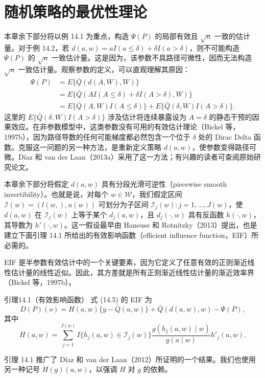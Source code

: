 \section{随机策略的最优性理论}

本章余下部分将以例 14.1 为重点，构造 $\Psi(P)$ 的局部有效且 $\sqrt n$ 一致的估计量。对于例 14.2，若 $d(a,w)=aI(a\leq\delta)+\delta I(a>\delta)$，则不可能构造 $\Psi(P)$ 的 $\sqrt n$ 一致估计量。这是因为，该参数不具路径可微性，因而无法构造 $\sqrt n$ 一致估计量。观察参数的定义，可以直观理解其原因：
\[
\begin{aligned}
 \Psi(P)&=E\{\bar Q(d(A,W),W)\}\\
 &=E\{\bar Q(AI(A\leq\delta)+\delta I(A>\delta),W)\}\\
 &=E\{\bar Q(A,W)I(A\leq\delta)\}+E\{\bar Q(\delta,W)I(A>\delta)\}.
\end{aligned}
\]
这里的 $E\{\bar Q(\delta,W)I(A>\delta)\}$ 涉及估计将连续暴露设为 $A=\delta$ 的静态干预的因果效应。在非参数模型中，这类参数没有可用的有效估计理论（Bickel 等，1997b），因为路径导数的任何可能梯度都必然包含一个位于 $\delta$ 处的 Dirac Delta 函数。克服这一问题的另一种方法，是重新定义策略 $d(a,w)$，使参数变得路径可微。Díaz 和 van der Laan（2013a）采用了这一方法；有兴趣的读者可查阅原始研究论文。

本章余下部分将假定 $d(a,w)$ 具有分段光滑可逆性（piecewise smooth invertibility）。也就是说，对每个 $w\in\mathcal W$，我们假定区间 $\mathcal I(w)=(l(w,),u(w))$ 可划分为子区间 $\mathcal I_j(w):j=1,\ldots,J(w)$，使 $d(a,w)$ 在 $\mathcal I_j(w)$ 上等于某个 $d_j(a,w)$，且 $d_j(\cdot,w)$ 具有反函数 $h(\cdot,w)$，其导数为 $h'(\cdot,w)$。这一假设最早由 Haneuse 和 Rotnitzky（2013）提出，也是建立下面引理 14.1 所给出的有效影响函数（efficient influence function，EIF）所必需的。

EIF 是半参数有效估计中的一个关键要素，因为它定义了任意有效的正则渐近线性估计量的线性近似。因此，其方差就是所有正则渐近线性估计量的渐近效率界（Bickel 等，1997b）。

\begin{bookresult}{引理}{14.1（有效影响函数）}
式 (14.5) 的 EIF 为
\begin{equation}
 D(P)(o)=H(a,w)\{y-\bar Q(a,w)\}+\bar Q(d(a,w),w)-\Psi(P),
 \tag{14.6}
\end{equation}
其中
\[
 H(a,w)=\sum_{j=1}^{J(w)}I\{h_j(a,w)\in\mathcal I_j(w)\}
 \frac{g(h_j(a,w)\mid w)}{g(a\mid w)}h'_j(a,w).
\]
\end{bookresult}

引理 14.1 推广了 Díaz 和 van der Laan（2012）所证明的一个结果。我们也使用另一种记号 $H(g)(a,w)$，以强调 $H$ 对 $g$ 的依赖。

